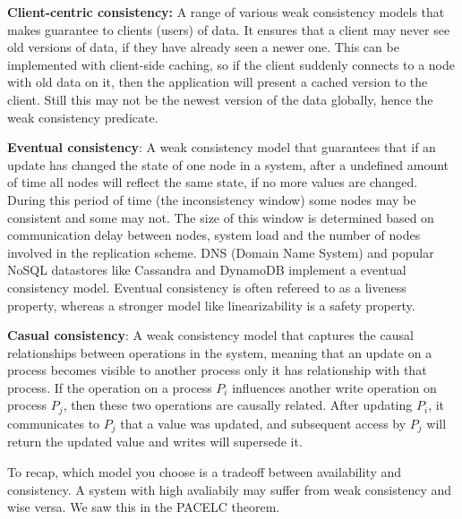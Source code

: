 \noindent \textbf{Client-centric consistency:} A range of various weak consistency models that makes guarantee to clients (users) of data. It ensures that a client may never see old versions of data, if they have already seen a newer one. This can be implemented with client-side caching, so if the client suddenly connects to a node with old data on it, then the application will present a cached version to the client. Still this may not be the newest version of the data globally, hence the weak consistency predicate.

\noindent \textbf{Eventual consistency}: A weak consistency model that guarantees that if an update has changed the state of one node in a system, after a undefined amount of time all nodes will reflect the same state, if no more values are changed. During this period of time (the inconsistency window) some nodes may be consistent and some may not. The size of this window is determined based on communication delay between nodes, system load and the number of nodes involved in the replication scheme. DNS (Domain Name System) and popular NoSQL datastores like Cassandra and DynamoDB implement a eventual consistency model. Eventual consistency is often refereed to as a liveness property, whereas a stronger model like linearizability is a safety property.

\noindent \textbf{Casual consistency}: A weak consistency model that captures the causal relationships between operations in the system, meaning that an update on a process becomes visible to another process only it has relationship with that process. If the operation on a process $P_i$ influences another write operation on process $P_j$, then these two operations are causally related. After updating $P_i$, it communicates to $P_j$ that a value was updated, and subsequent access by $P_j$ will return the updated value and writes will supersede it.

\noindent To recap, which model you choose is a tradeoff between availability and consistency. A system with high avaliabily may suffer from weak consistency and wise versa. We saw this in the PACELC theorem.